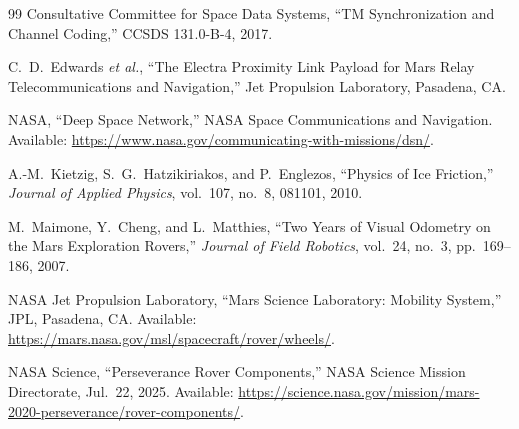 \documentclass[11pt]{article}
\begin{document}
\begin{thebibliography}{99}
Consultative Committee for Space Data Systems, ``TM Synchronization and Channel Coding,'' CCSDS
131.0-B-4, 2017.

C.~D.~Edwards \textit{et al.}, ``The Electra Proximity Link Payload for Mars Relay
Telecommunications and Navigation,'' Jet Propulsion Laboratory, Pasadena, CA.

NASA, ``Deep Space Network,'' NASA Space Communications and Navigation.
Available: \url{https://www.nasa.gov/communicating-with-missions/dsn/}.

A.-M.\ Kietzig, S.~G.\ Hatzikiriakos, and P.~Englezos, ``Physics of Ice Friction,'' \textit{Journal
of Applied Physics}, vol.\ 107, no.\ 8, 081101, 2010.

M.~Maimone, Y.~Cheng, and L.~Matthies, ``Two Years of Visual Odometry on the Mars Exploration
Rovers,'' \textit{Journal of Field Robotics}, vol.\ 24, no.\ 3, pp.\ 169--186, 2007.

NASA Jet Propulsion Laboratory, ``Mars Science Laboratory: Mobility System,'' JPL, Pasadena, CA.
Available: \url{https://mars.nasa.gov/msl/spacecraft/rover/wheels/}.

NASA Science, ``Perseverance Rover Components,'' NASA Science Mission Directorate, Jul.\ 22,
2025. Available: \url{https://science.nasa.gov/mission/mars-2020-perseverance/rover-components/}.

\end{thebibliography}
\end{document}

